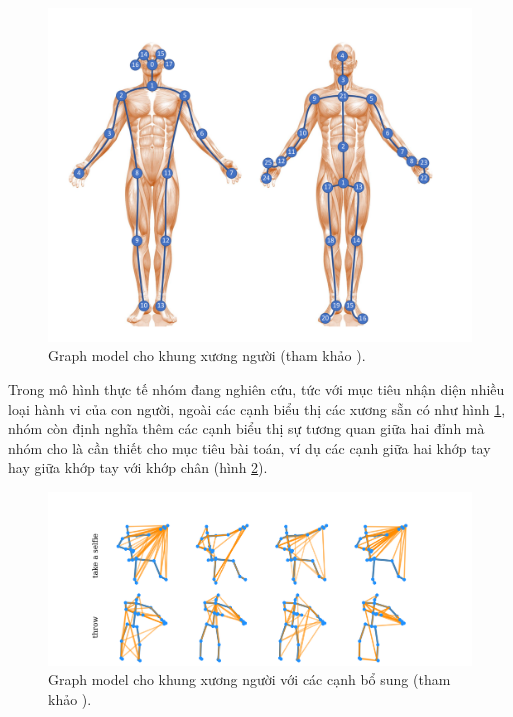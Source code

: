 \begin{figure}[!ht]
    \begin{center}
        \includegraphics[width=\linewidth]{asset/image/skeleton.png}
        \caption{Graph model cho khung xương người (tham khảo \cite{shi2020skeleton}). }
        \label{fig:skeleton}
    \end{center}
\end{figure}

Trong mô hình thực tế nhóm đang nghiên cứu, tức với mục tiêu nhận diện nhiều loại hành vi của con người, ngoài các cạnh biểu thị các xương sẵn có như hình \ref{fig:skeleton}, nhóm còn định nghĩa thêm các cạnh biểu thị sự tương quan giữa hai đỉnh mà nhóm cho là cần thiết cho mục tiêu bài toán, ví dụ các cạnh giữa hai khớp tay hay giữa khớp tay với khớp chân (hình \ref{fig:morebones}).

\begin{figure}[t]
    \begin{center}
        \includegraphics[width=\linewidth]{asset/image/morebones.png}
        \caption{Graph model cho khung xương người với các cạnh bổ sung (tham khảo \cite{shi2020skeleton}). }
        \label{fig:morebones}
    \end{center}
\end{figure}

